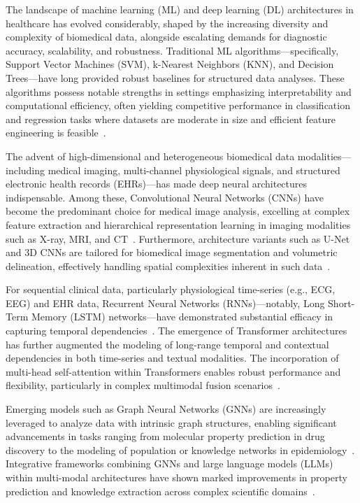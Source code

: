 \documentclass[sigconf]{acmart}
\begin{document}
The landscape of machine learning (ML) and deep learning (DL) architectures in healthcare has evolved considerably, shaped by the increasing diversity and complexity of biomedical data, alongside escalating demands for diagnostic accuracy, scalability, and robustness. Traditional ML algorithms—specifically, Support Vector Machines (SVM), k-Nearest Neighbors (KNN), and Decision Trees—have long provided robust baselines for structured data analyses. These algorithms possess notable strengths in settings emphasizing interpretability and computational efficiency, often yielding competitive performance in classification and regression tasks where datasets are moderate in size and efficient feature engineering is feasible~\cite{ref16, ref28}.

The advent of high-dimensional and heterogeneous biomedical data modalities—including medical imaging, multi-channel physiological signals, and structured electronic health records (EHRs)—has made deep neural architectures indispensable. Among these, Convolutional Neural Networks (CNNs) have become the predominant choice for medical image analysis, excelling at complex feature extraction and hierarchical representation learning in imaging modalities such as X-ray, MRI, and CT~\cite{ref28, ref31, ref50, ref55, ref70, ref71, ref72, ref74, ref75, ref90, ref107}. Furthermore, architecture variants such as U-Net and 3D CNNs are tailored for biomedical image segmentation and volumetric delineation, effectively handling spatial complexities inherent in such data~\cite{ref49, ref50, ref56, ref53}.

For sequential clinical data, particularly physiological time-series (e.g., ECG, EEG) and EHR data, Recurrent Neural Networks (RNNs)—notably, Long Short-Term Memory (LSTM) networks—have demonstrated substantial efficacy in capturing temporal dependencies~\cite{ref29, ref42, ref43, ref55}. The emergence of Transformer architectures has further augmented the modeling of long-range temporal and contextual dependencies in both time-series and textual modalities. The incorporation of multi-head self-attention within Transformers enables robust performance and flexibility, particularly in complex multimodal fusion scenarios~\cite{ref28, ref31, ref35, ref48, ref49, ref54, ref65, ref76, ref77, ref90}.

Emerging models such as Graph Neural Networks (GNNs) are increasingly leveraged to analyze data with intrinsic graph structures, enabling significant advancements in tasks ranging from molecular property prediction in drug discovery to the modeling of population or knowledge networks in epidemiology~\cite{ref33, ref35, ref57}. Integrative frameworks combining GNNs and large language models (LLMs) within multi-modal architectures have shown marked improvements in property prediction and knowledge extraction across complex scientific domains~\cite{ref33}.
\end{document}

